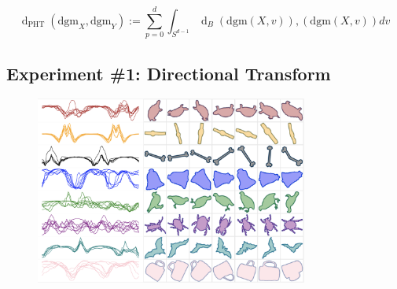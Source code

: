 \documentclass[
  letterpaper,
  DIV=11,
  numbers=noendperiod,
  oneside]{scrartcl}
\begin{document}
\[ \operatorname{d}_{\mathrm{PHT}}\left(\mathrm{dgm}_X, \mathrm{dgm}_Y\right):=\sum_{p=0}^d \int_{S^{d-1}} \operatorname{d}_B\left(\mathrm{dgm}(X, v) \right), \left( \mathrm{dgm}(X, v) \right) dv \]

\begin{figure}

\begin{minipage}[t]{0.50\linewidth}

{\centering 


}

\end{minipage}%
%
\begin{minipage}[t]{0.50\linewidth}

{\centering 


}

\end{minipage}%

\end{figure}

\hypertarget{experiment-1-directional-transform-4}{%
\subsection{Experiment \#1: Directional
Transform}\label{experiment-1-directional-transform-4}}

\begin{figure}

{\centering \includegraphics[width=0.8\textwidth,height=1\textheight]{shape_signatures.png}

}

\end{figure}
\end{document}
